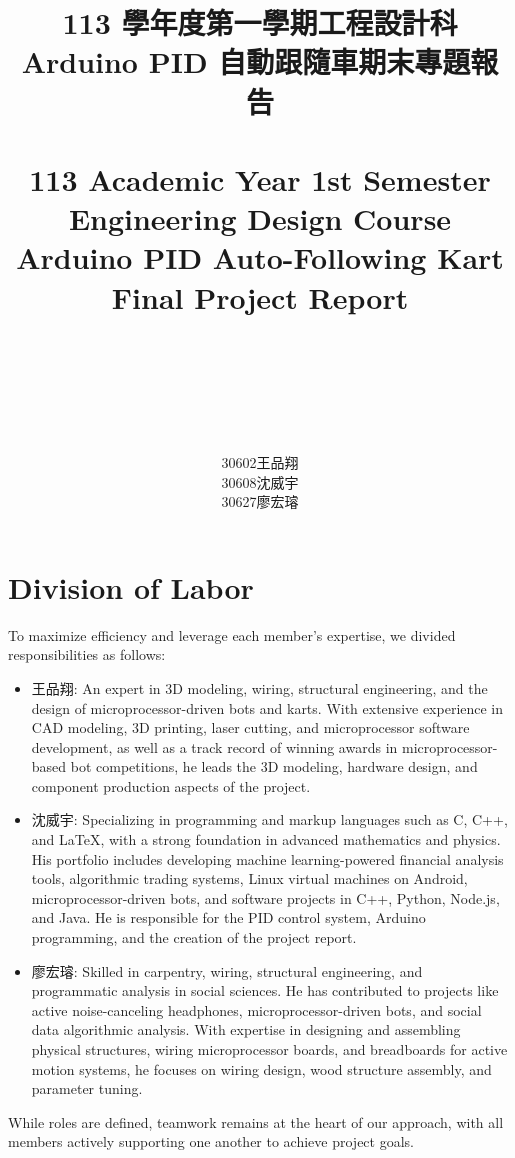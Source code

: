\documentclass[a4paper,12pt]{article}
\begin{document}
\title{
\Large 113 學年度第一學期工程設計科\\
\LARGE Arduino PID 自動跟隨車期末專題報告\\\mbox{}\\
\Large 113 Academic Year 1st Semester Engineering Design Course\\
\LARGE Arduino PID Auto-Following Kart Final Project Report
\mbox{}\\\mbox{}\\\mbox{}\\\mbox{}\\
}
\author{30602王品翔\\30608沈威宇\\30627廖宏璿}
\date{\temtoday}
\titletocdoc

\section{Division of Labor}
To maximize efficiency and leverage each member's expertise, we divided responsibilities as follows:
\begin{itemize}
\item 王品翔: An expert in 3D modeling, wiring, structural engineering, and the design of microprocessor-driven bots and karts. With extensive experience in CAD modeling, 3D printing, laser cutting, and microprocessor software development, as well as a track record of winning awards in microprocessor-based bot competitions, he leads the 3D modeling, hardware design, and component production aspects of the project.
\item 沈威宇: Specializing in programming and markup languages such as C, C++, and LaTeX, with a strong foundation in advanced mathematics and physics. His portfolio includes developing machine learning-powered financial analysis tools, algorithmic trading systems, Linux virtual machines on Android, microprocessor-driven bots, and software projects in C++, Python, Node.js, and Java. He is responsible for the PID control system, Arduino programming, and the creation of the project report.
\item 廖宏璿: Skilled in carpentry, wiring, structural engineering, and programmatic analysis in social sciences. He has contributed to projects like active noise-canceling headphones, microprocessor-driven bots, and social data algorithmic analysis. With expertise in designing and assembling physical structures, wiring microprocessor boards, and breadboards for active motion systems, he focuses on wiring design, wood structure assembly, and parameter tuning.
\end{itemize}
While roles are defined, teamwork remains at the heart of our approach, with all members actively supporting one another to achieve project goals.
\end{document}
